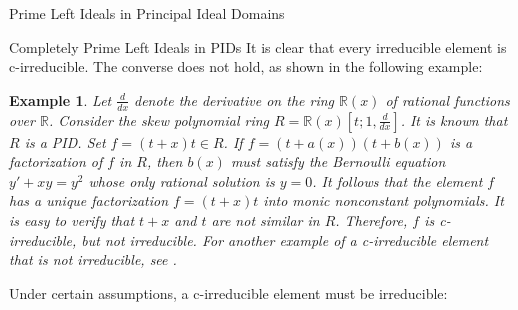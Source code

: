 \documentclass[11pt,a4paper]{article}
\theoremstyle{theorem}
\newtheorem{example}{Example}[section]
\numberwithin{equation}{section}
\begin{document}
\begin{section}{Prime Left Ideals in Principal Ideal Domains}
\begin{subsection}{Completely Prime Left Ideals in PIDs }
		It is clear that every irreducible element is c-irreducible. The converse does not hold, as shown in the following example:
		\begin{example}
			Let \(\frac{d}{dx}\) denote the derivative on the ring \(\mathbb{R}(x)\) of rational functions over  \(\mathbb{R}\). Consider the skew polynomial ring \(R = \mathbb{R}(x)[t;1,\frac{d}{dx}]\). It is known that \(R\) is a PID. Set \(f = (t+x)t\in R\). If \(f = (t+a(x))(t+b(x))\) is a factorization of \(f\) in \(R\), then \(b(x)\) must satisfy the Bernoulli equation \(y'+xy=y^2\) whose only rational solution is \(y=0\). It follows that the element \(f\) has a unique factorization \(f = (t+x)t\) into monic nonconstant polynomials. It is easy to verify that \(t+x\) and \(t\) are not similar in \(R\).  Therefore, \(f\) is  c-irreducible, but not irreducible. For another example of a c-irreducible element that is not irreducible, see \cite[Proposition 4.5]{alon2022completely}. 
		\end{example}
		
		 Under certain assumptions, a c-irreducible element must be irreducible: 
		

\end{subsection}
\end{section}
\end{document}
